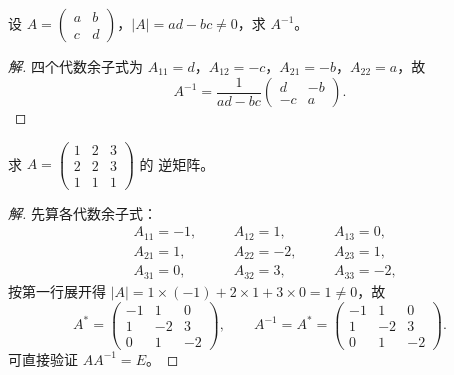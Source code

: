 \begin{example}\label{ex:inv-2}
设 $A=\begin{pmatrix} a & b \\ c & d \end{pmatrix}$，$|A|=ad-bc\neq 0$，求
$A^{-1}$。
\end{example}
\begin{proof}[解]
四个代数余子式为 $A_{11}=d$，$A_{12}=-c$，$A_{21}=-b$，$A_{22}=a$，故
\[
  A^{-1}=\frac{1}{ad-bc}\begin{pmatrix} d & -b \\ -c & a \end{pmatrix}.
\]
\end{proof}

\begin{example}\label{ex:inv-3}
求 $A=\begin{pmatrix} 1 & 2 & 3 \\ 2 & 2 & 3 \\ 1 & 1 & 1 \end{pmatrix}$ 的
逆矩阵。
\end{example}
\begin{proof}[解]
先算各代数余子式：
\[
  \begin{aligned}
    & A_{11}=-1,\quad && A_{12}=1,\quad && A_{13}=0, \\
    & A_{21}=1,\quad  && A_{22}=-2,\quad && A_{23}=1, \\
    & A_{31}=0,\quad  && A_{32}=3,\quad  && A_{33}=-2,
  \end{aligned}
\]
按第一行展开得 $|A|=1\times(-1)+2\times 1+3\times 0=1\neq 0$，故
\[
  A^*=\begin{pmatrix} -1 & 1 & 0 \\ 1 & -2 & 3 \\ 0 & 1 & -2 \end{pmatrix},
  \qquad
  A^{-1}=A^*=\begin{pmatrix} -1 & 1 & 0 \\ 1 & -2 & 3 \\ 0 & 1 & -2 \end{pmatrix}.
\]
可直接验证 $AA^{-1}=E$。
\end{proof}

